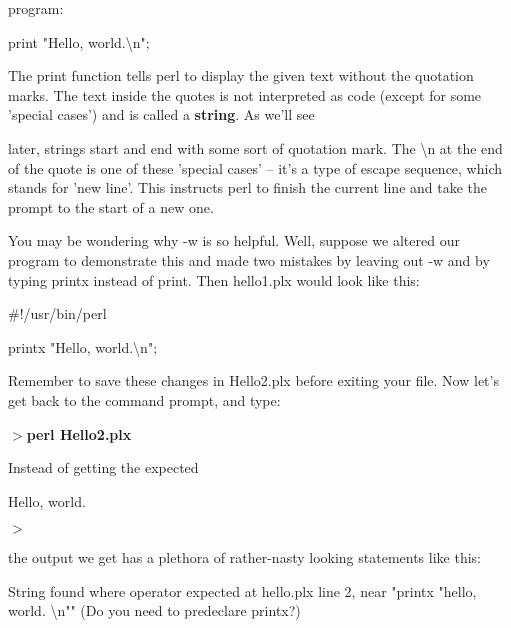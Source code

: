 \documentclass[a4paper,11pt]{book}
\begin{document}
\noindent program:

\noindent 

\noindent 

\noindent print "Hello, world.\textbackslash n";

\noindent 

\noindent The print function tells perl to display the given text without the quotation marks. The text inside the quotes is not interpreted as code (except for some 'special cases') and is called a \textbf{string}. As we'll see

\noindent later, strings start and end with some sort of quotation mark. The \textbackslash n at the end of the quote is one of these  'special cases' -- it's a type of escape sequence, which stands for 'new line'. This instructs perl to finish the current line and take the prompt to the start of a new one.

\noindent 

\noindent You may be wondering why -w is so helpful.   Well, suppose we altered our program to demonstrate this and made two mistakes by leaving out -w and by typing printx instead of print. Then hello1.plx would look like this:

\noindent 

\noindent \#!/usr/bin/perl

\noindent 

\noindent printx "Hello, world.\textbackslash n";

\noindent 

\noindent Remember to save these changes in Hello2.plx before exiting your file. Now let's get back to the command prompt, and type:

\noindent 

\noindent \textbf{$>$perl Hello2.plx}

\noindent 

\noindent Instead of getting the expected

\noindent 

\noindent Hello, world.

\noindent $>$

\noindent 

\noindent the output we get has a plethora of rather-nasty looking statements like this:

\noindent 

\noindent String found where operator expected at hello.plx line 2, near "printx "hello, world. \textbackslash n"" (Do you need to predeclare printx?)
\end{document}
